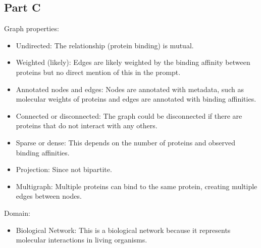 \documentclass[12pt]{article}
\begin{document}
\subsection*{Part C}
Graph properties:
\begin{itemize}
    \item Undirected: The relationship (protein binding) is mutual.
    \item Weighted (likely): Edges are likely weighted by the binding affinity between proteins but no direct mention of this in the prompt.
    \item Annotated nodes and edges: Nodes are annotated with metadata, such as molecular weights of proteins and edges are annotated with binding affinities.
    \item Connected or disconnected: The graph could be disconnected if there are proteins that do not interact with any others.
    \item Sparse or dense: This depends on the number of proteins and observed binding affinities.
    \item Projection: Since not bipartite.
    \item Multigraph: Multiple proteins can bind to the same protein, creating multiple edges between nodes.
\end{itemize}

\noindent Domain:
\begin{itemize}
    \item Biological Network: This is a biological network because it represents molecular interactions in living organisms.
\end{itemize}
\end{document}
